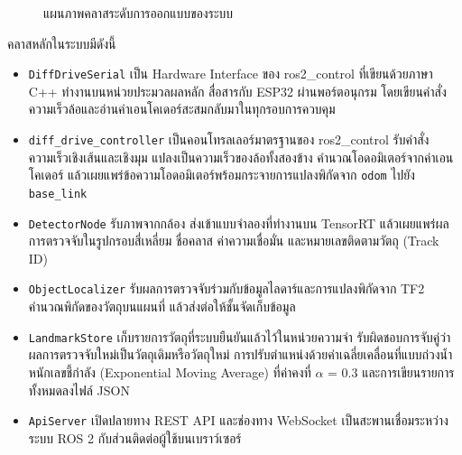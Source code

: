 \documentclass[a4paper,12pt]{report}
\begin{document}
\begin{figure}[H]
\caption[แผนภาพคลาสระดับการออกแบบของระบบ (บทที่ 3)]{แผนภาพคลาสระดับการออกแบบของระบบ}
\label{fig:class}
\end{figure}

คลาสหลักในระบบมีดังนี้

\begin{itemize}[leftmargin=1.25cm, itemsep=4pt, topsep=6pt]
    \item \texttt{DiffDriveSerial} เป็น Hardware Interface ของ ros2\_control
    ที่เขียนด้วยภาษา C++ ทำงานบนหน่วยประมวลผลหลัก สื่อสารกับ ESP32 ผ่านพอร์ตอนุกรม
    โดยเขียนคำสั่งความเร็วล้อและอ่านค่าเอนโคเดอร์สะสมกลับมาในทุกรอบการควบคุม

    \item \texttt{diff\_drive\_controller} เป็นคอนโทรลเลอร์มาตรฐานของ ros2\_control
    รับคำสั่งความเร็วเชิงเส้นและเชิงมุม แปลงเป็นความเร็วของล้อทั้งสองข้าง
    คำนวณโอดอมิเตอร์จากค่าเอนโคเดอร์
    แล้วเผยแพร่ข้อความโอดอมิเตอร์พร้อมกระจายการแปลงพิกัดจาก \texttt{odom}
    ไปยัง \texttt{base\_link}

    \item \texttt{DetectorNode} รับภาพจากกล้อง
    ส่งเข้าแบบจำลองที่ทำงานบน TensorRT
    แล้วเผยแพร่ผลการตรวจจับในรูปกรอบสี่เหลี่ยม ชื่อคลาส ค่าความเชื่อมั่น
    และหมายเลขติดตามวัตถุ (Track ID)

    \item \texttt{ObjectLocalizer} รับผลการตรวจจับร่วมกับข้อมูลไลดาร์และการแปลงพิกัดจาก TF2
    คำนวณพิกัดของวัตถุบนแผนที่ แล้วส่งต่อให้ชั้นจัดเก็บข้อมูล

    \item \texttt{LandmarkStore} เก็บรายการวัตถุที่ระบบยืนยันแล้วไว้ในหน่วยความจำ
    รับผิดชอบการจับคู่ว่าผลการตรวจจับใหม่เป็นวัตถุเดิมหรือวัตถุใหม่
    การปรับตำแหน่งด้วยค่าเฉลี่ยเคลื่อนที่แบบถ่วงน้ำหนักเลขชี้กำลัง
    (Exponential Moving Average) ที่ค่าคงที่ $\alpha$ = 0.3
    และการเขียนรายการทั้งหมดลงไฟล์ JSON

    \item \texttt{ApiServer} เปิดปลายทาง REST API และช่องทาง WebSocket
    เป็นสะพานเชื่อมระหว่างระบบ ROS 2 กับส่วนติดต่อผู้ใช้บนเบราว์เซอร์
\end{itemize}
\end{document}
